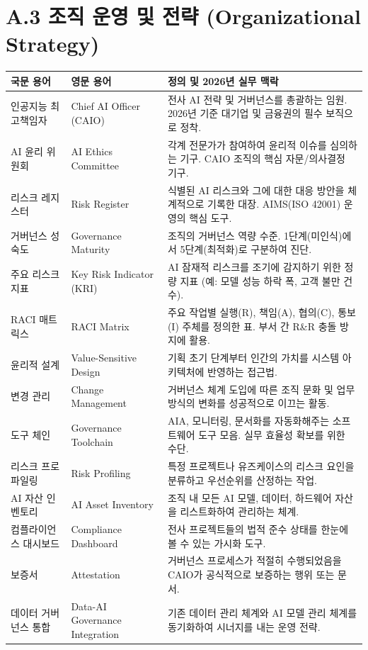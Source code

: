\newpage
\section*{A.3 조직 운영 및 전략 (Organizational Strategy)}

\begin{table}[htbp]
\centering
\begin{tabularx}{\textwidth}{p{3.5cm}p{4cm}X}
\toprule
\textbf{국문 용어} & \textbf{영문 용어} & \textbf{정의 및 2026년 실무 맥락} \\
\midrule
인공지능 최고책임자 & Chief AI Officer (CAIO) & 전사 AI 전략 및 거버넌스를 총괄하는 임원. 2026년 기준 대기업 및 금융권의 필수 보직으로 정착. \\
\midrule
AI 윤리 위원회 & AI Ethics Committee & 각계 전문가가 참여하여 윤리적 이슈를 심의하는 기구. CAIO 조직의 핵심 자문/의사결정 기구. \\
\midrule
리스크 레지스터 & Risk Register & 식별된 AI 리스크와 그에 대한 대응 방안을 체계적으로 기록한 대장. AIMS(ISO 42001) 운영의 핵심 도구. \\
\midrule
거버넌스 성숙도 & Governance Maturity & 조직의 거버넌스 역량 수준. 1단계(미인식)에서 5단계(최적화)로 구분하여 진단. \\
\midrule
주요 리스크 지표 & Key Risk Indicator (KRI) & AI 잠재적 리스크를 조기에 감지하기 위한 정량 지표 (예: 모델 성능 하락 폭, 고객 불만 건수). \\
\midrule
RACI 매트릭스 & RACI Matrix & 주요 작업별 실행(R), 책임(A), 협의(C), 통보(I) 주체를 정의한 표. 부서 간 R\&R 충돌 방지에 활용. \\
\midrule
윤리적 설계 & Value-Sensitive Design & 기획 초기 단계부터 인간의 가치를 시스템 아키텍처에 반영하는 접근법. \\
\midrule
변경 관리 & Change Management & 거버넌스 체계 도입에 따른 조직 문화 및 업무 방식의 변화를 성공적으로 이끄는 활동. \\
\midrule
도구 체인 & Governance Toolchain & AIA, 모니터링, 문서화를 자동화해주는 소프트웨어 도구 모음. 실무 효율성 확보를 위한 수단. \\
\midrule
리스크 프로파일링 & Risk Profiling & 특정 프로젝트나 유즈케이스의 리스크 요인을 분류하고 우선순위를 산정하는 작업. \\
\midrule
AI 자산 인벤토리 & AI Asset Inventory & 조직 내 모든 AI 모델, 데이터, 하드웨어 자산을 리스트화하여 관리하는 체계. \\
\midrule
컴플라이언스 대시보드 & Compliance Dashboard & 전사 프로젝트들의 법적 준수 상태를 한눈에 볼 수 있는 가시화 도구. \\
\midrule
보증서 & Attestation & 거버넌스 프로세스가 적절히 수행되었음을 CAIO가 공식적으로 보증하는 행위 또는 문서. \\
\midrule
데이터 거버넌스 통합 & Data-AI Governance Integration & 기존 데이터 관리 체계와 AI 모델 관리 체계를 동기화하여 시너지를 내는 운영 전략. \\
\bottomrule
\end{tabularx}
\end{table}
